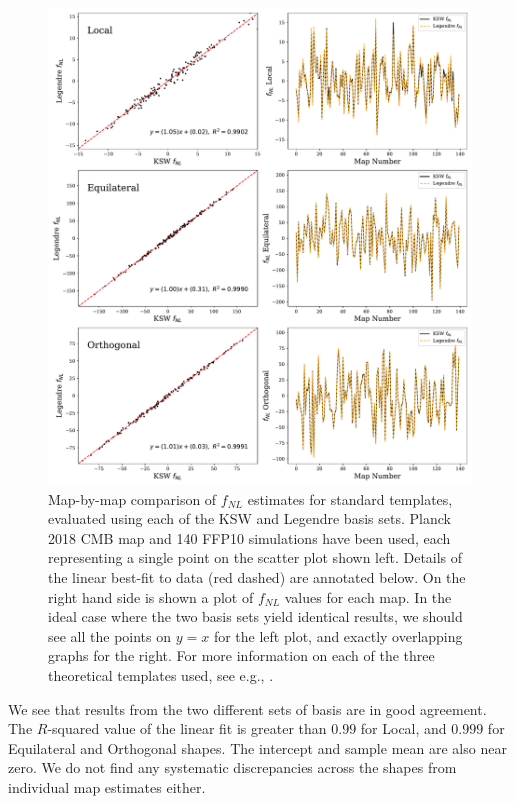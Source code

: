 \begin{figure}[htbp!] 
	\centering 
	\includegraphics[width=\textwidth]{map_by_map_Legendre_KSW.pdf}
	\caption{Map-by-map comparison of $f_{NL}$ estimates for standard templates, evaluated using each of the KSW and Legendre basis sets. Planck 2018 CMB map and 140 FFP10 simulations have been used, each representing a single point on the scatter plot shown left. Details of the linear best-fit to data (red dashed) are annotated below. On the right hand side is shown a plot of $f_{NL}$ values for each map. In the ideal case where the two basis sets yield identical results, we should see all the points on $y=x$ for the left plot, and exactly overlapping graphs for the right. For more information on  each of the three theoretical templates used, see e.g., \cite{PlanckCollaboration2013}.}
	\label{fig:map_by_map_Legendre_KSW}
\end{figure}

We see that results from the two different sets of basis are in good agreement. The $R$-squared value of the linear fit is greater than $0.99$ for Local, and $0.999$ for Equilateral and Orthogonal shapes. The intercept and sample mean are also near zero. We do not find any systematic discrepancies across the shapes from individual map estimates either.

